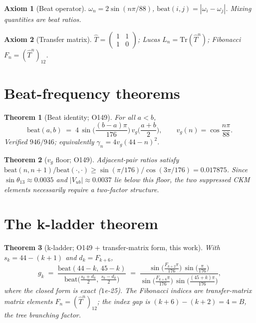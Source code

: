 \documentclass[12pt]{article}
\newtheorem{axiom}{Axiom}
\newtheorem{theorem}{Theorem}
\newcommand{\T}{\hat{T}}
\begin{document}
\begin{axiom}[Beat operator]
$\omega_n = 2\sin(n\pi/88)$, $\mathrm{beat}(i,j) = |\omega_i - \omega_j|$.
Mixing quantities are beat ratios.
\end{axiom}

\begin{axiom}[Transfer matrix]
$\T = \begin{pmatrix}1&1\\1&0\end{pmatrix}$; Lucas $L_n = \mathrm{Tr}(\T^n)$;
Fibonacci $F_n = (\T^n)_{12}$.
\end{axiom}

\section{Beat-frequency theorems}
\label{sec:beat}
\begin{theorem}[Beat identity; O149]
\label{thm:beatid}
For all $a<b$,
\begin{equation}
\label{eq:beatid}
\mathrm{beat}(a,b) \;=\; 4\,\sin\!\Big(\frac{(b-a)\pi}{176}\Big)\,
v_g\!\Big(\frac{a+b}{2}\Big),
\qquad v_g(n) = \cos\frac{n\pi}{88}.
\end{equation}
\emph{Verified} $946/946$; equivalently $\gamma_n = 4v_g(44-n)^2$.
\end{theorem}

\begin{theorem}[$v_g$ floor; O149]
Adjacent-pair ratios satisfy
$\mathrm{beat}(n,n{+}1)/\mathrm{beat}(\cdot,\cdot) \ge
\sin(\pi/176)/\cos(3\pi/176) = 0.017875$. Since
$\sin\theta_{13} \approx 0.0035$ and $|V_{ub}| \approx 0.0037$ lie below this
floor, the two suppressed CKM elements necessarily require a two-factor
structure.
\end{theorem}

\section{The k-ladder theorem}
\label{sec:ladder}
\begin{theorem}[k-ladder; O149 + transfer-matrix form, this work]
\label{thm:ladder}
With $s_k = 44-(k{+}1)$ and $d_k = F_{k+6}$,
\begin{equation}
\label{eq:ladder}
g_k \;=\; \frac{\mathrm{beat}(44{-}k,\,45{-}k)}
{\mathrm{beat}\big(\tfrac{s_k+d_k}{2},\,\tfrac{s_k-d_k}{2}\big)}
\;=\; \frac{\sin\!\big(\tfrac{F_{k+2}\pi}{176}\big)\,
\sin\!\big(\tfrac{\pi}{176}\big)}
{\sin\!\big(\tfrac{F_{k+6}\pi}{176}\big)\,
\sin\!\big(\tfrac{(45+k)\pi}{176}\big)},
\end{equation}
where the closed form is exact ($1$e-25). The Fibonacci indices are
transfer-matrix matrix elements $F_n = (\T^n)_{12}$; the index gap is
$(k{+}6)-(k{+}2) = 4 = B$, the tree branching factor.
\end{theorem}
\end{document}
